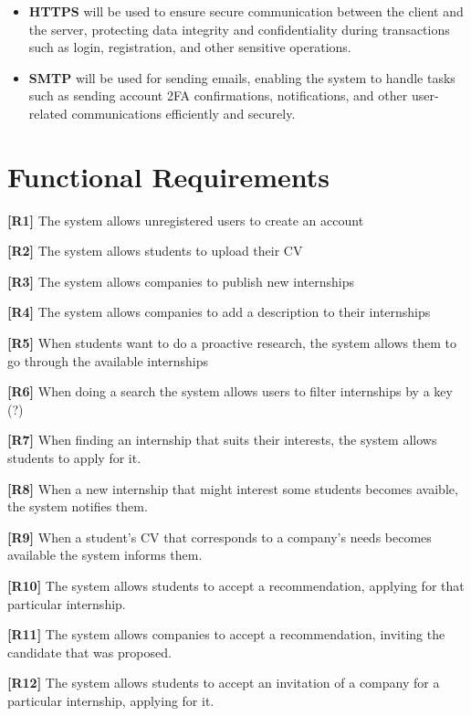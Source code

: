 \begin{itemize}
    \item \textbf{HTTPS} will be used to ensure secure communication between the client and the server, protecting data integrity and confidentiality during transactions such as login, registration, and other sensitive operations.
    
    \item \textbf{SMTP} will be used for sending emails, enabling the system to handle tasks such as sending account 2FA confirmations, notifications, and other user-related communications efficiently and securely.

\end{itemize}

\pagebreak
\section{Functional Requirements}

\textbf{[R1]} The system allows unregistered users to create an account

\textbf{[R2]} The system allows students to upload their CV

\textbf{[R3]} The system allows companies to publish new internships

\textbf{[R4]} The system allows companies to add a description to their internships

\textbf{[R5]} When students want to do a proactive research, the system allows them to go through the available internships

\textbf{[R6]} When doing a search the system allows users to filter internships by a key (?)

\textbf{[R7]} When finding an internship that suits their interests, the system allows students to apply for it. 

\textbf{[R8]} When a new internship that might interest some students becomes avaible, the system notifies them.

\textbf{[R9]} When a student's CV that corresponds to a company's needs becomes available the system informs them. 

\textbf{[R10]} The system allows students to accept a recommendation, applying for that particular internship. 

\textbf{[R11]} The system allows companies to accept a recommendation, inviting the candidate that was proposed.

\textbf{[R12]} The system allows students to accept an invitation of a company for a particular internship, applying for it.


